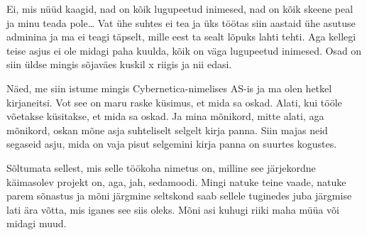 
Ei, mis nüüd kaagid, nad on kõik lugupeetud inimesed, nad on kõik skeene peal ja minu teada pole\ldots {} Vat ühe suhtes ei tea ja üks töötas siin aastaid ühe asutuse adminina  ja ma ei teagi täpselt, mille eest ta sealt lõpuks lahti tehti. Aga kellegi teise asjus ei ole midagi paha kuulda, kõik on väga lugupeetud inimesed. Osad on siin üldse mingis sõjaväes kuskil x riigis ja nii edasi. 


Näed, me siin istume mingis Cybernetica-nimelises AS-is ja ma olen hetkel kirjaneitsi. Vot see on maru raske küsimus, et mida sa oskad. Alati, kui tööle võetakse küsitakse, et mida sa oskad. Ja mina mõnikord, mitte alati, aga mõnikord, oskan mõne asja suhteliselt selgelt kirja panna. Siin majas neid segaseid asju, mida on vaja pisut selgemini kirja panna on suurtes kogustes. 


Sõltumata sellest, mis selle töökoha nimetus on, milline see järjekordne käimasolev projekt on, aga, jah, sedamoodi. Mingi natuke teine vaade, natuke parem sõnastus ja mõni järgmine seltskond saab sellele tuginedes juba järgmise lati ära võtta, mis iganes see siis oleks. Mõni asi kuhugi riiki maha müüa või midagi muud. 